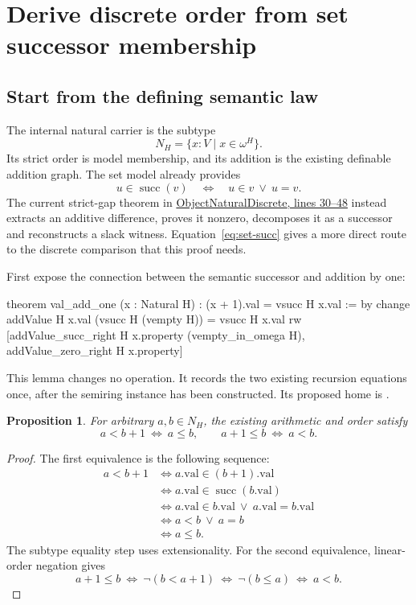 \documentclass[11pt,letterpaper]{article}
\newcommand{\code}[1]{\texttt{\small\detokenize{#1}}}
\newcommand{\src}[3]{\href{https://github.com/VladimirReshetnikov/ProveIt/blob/89226e3921bce3e8949fadd12d3efb6914c7630c/Computability/DiophantineConsistency/Lean/DiophantineConsistency/#1.lean\#L#2-L#3}{\textsf{#1}, lines #2--#3}}
\newcommand{\succv}{\operatorname{succ}}
\newtheorem{proposition}{Proposition}[section]
\begin{document}
\section{Derive discrete order from set successor membership}
\label{sec:successor}

\subsection{Start from the defining semantic law}

The internal natural carrier is the subtype
\[
  N_H=\{x:V\mid x\in\omega^H\}.
\]
Its strict order is model membership, and its addition is the existing definable addition graph. The set model already provides
\begin{equation}
  u\in\succv(v)\quad\Longleftrightarrow\quad u\in v\ \lor\ u=v.
  \label{eq:set-succ}
\end{equation}
The current strict-gap theorem in \src{ObjectNaturalDiscrete}{30}{48} instead extracts an additive difference, proves it nonzero, decomposes it as a successor and reconstructs a slack witness. Equation~\eqref{eq:set-succ} gives a more direct route to the discrete comparison that this proof needs.

First expose the connection between the semantic successor and addition by one:

\begin{Lean}
theorem val_add_one (x : Natural H) :
    (x + 1).val = vsucc H x.val := by
  change addValue H x.val (vsucc H (vempty H)) = vsucc H x.val
  rw [addValue_succ_right H x.property (vempty_in_omega H),
    addValue_zero_right H x.property]
\end{Lean}

This lemma changes no operation. It records the two existing recursion equations once, after the semiring instance has been constructed. Its proposed home is \code{ObjectOmegaSemiring.Natural}.

\begin{proposition}
For arbitrary $a,b\in N_H$, the existing arithmetic and order satisfy
\[
  a<b+1\ \Longleftrightarrow\ a\le b,
  \qquad
  a+1\le b\ \Longleftrightarrow\ a<b.
\]
\end{proposition}
\begin{proof}
The first equivalence is the following sequence:
\begin{align*}
a<b+1
&\Longleftrightarrow a.\mathrm{val}\in(b+1).\mathrm{val}\\
&\Longleftrightarrow a.\mathrm{val}\in\succv(b.\mathrm{val})\\
&\Longleftrightarrow a.\mathrm{val}\in b.\mathrm{val}
       \ \lor\ a.\mathrm{val}=b.\mathrm{val}\\
&\Longleftrightarrow a<b\ \lor\ a=b\\
&\Longleftrightarrow a\le b.
\end{align*}
The subtype equality step uses extensionality. For the second equivalence, linear-order negation gives
\[
a+1\le b\ \Longleftrightarrow\ \neg(b<a+1)
\ \Longleftrightarrow\ \neg(b\le a)
\ \Longleftrightarrow\ a<b.
\]
\end{proof}
\end{document}
